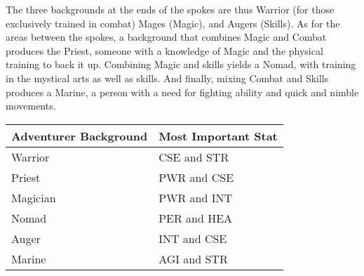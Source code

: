 \begin{multicols*}{2}
The three backgrounds at the ends of the spokes are thus Warrior (for those exclusively trained in combat) Mages (Magic), and Augers (Skills). As for the areas between the spokes, a background that combines Magic and Combat produces the Priest, someone with a knowledge of Magic and the physical training to back it up. Combining Magic and skills yields a Nomad, with training in the mystical arts as well as skills. And finally, mixing Combat and Skills produces a Marine, a person with a need for fighting ability and quick and nimble movements.

\begin{tabular}{@{}l l}
\textbf{Adventurer Background} & \textbf{Most Important Stat}\\
\midrule
Warrior & CSE and STR\\
Priest &  PWR and CSE\\
Magician &  PWR and INT\\
Nomad &  PER and HEA\\
Auger &  INT and CSE\\
Marine &  AGI and STR
\end{tabular}


\end{multicols*}
